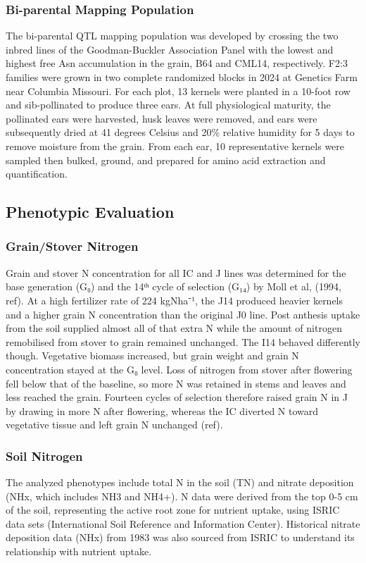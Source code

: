 \documentclass[pdflatex,sn-mathphys-num]{sn-jnl}%
\theoremstyle{thmstyleone}%
\theoremstyle{thmstyletwo}%
\theoremstyle{thmstylethree}%
\begin{document}
\subsubsection{Bi-parental Mapping Population}
The bi-parental QTL mapping population was developed by crossing the two inbred lines of the Goodman-Buckler Association Panel with the lowest and highest free Asn accumulation in the grain, B64 and CML14, respectively. F2:3 families were grown in two complete randomized blocks in 2024 at Genetics Farm near Columbia Missouri. For each plot, 13 kernels were planted in a 10-foot row and sib-pollinated to produce three ears. At full physiological maturity, the pollinated ears were harvested, husk leaves were removed, and ears were subsequently dried at 41 degrees Celsius and 20\% relative humidity for 5 days to remove moisture from the grain. From each ear, 10 representative kernels were sampled then bulked, ground, and prepared for amino acid extraction and quantification.


\subsection{Phenotypic Evaluation}
\subsubsection{Grain/Stover Nitrogen}
Grain and stover N concentration for all IC and J lines was determined for the base generation (G₀) and the 14ᵗʰ cycle of selection (G₁₄) by Moll et al, (1994, ref). At a high fertilizer rate of 224 kgNha⁻¹, the J14 produced heavier kernels and a higher grain N concentration than the original J0 line. Post anthesis uptake from the soil supplied almost all of that extra N while the amount of nitrogen remobilised from stover to grain remained unchanged. The I14 behaved differently though. Vegetative biomass increased, but grain weight and grain N concentration stayed at the G₀ level. Loss of nitrogen from stover after flowering fell below that of the baseline, so more N was retained in stems and leaves and less reached the grain. Fourteen cycles of selection therefore raised grain N in J by drawing in more N after flowering, whereas the IC diverted N toward vegetative tissue and left grain N unchanged (ref).

\subsubsection{Soil Nitrogen}
The analyzed phenotypes include total N in the soil (TN) and nitrate deposition (NHx, which includes NH3 and NH4+). N data were derived from the top 0-5 cm of the soil, representing the active root zone for nutrient uptake, using ISRIC data sets (International Soil Reference and Information Center). Historical nitrate deposition data (NHx) from 1983 was also sourced from ISRIC to understand its relationship with nutrient uptake. 
\end{document}
